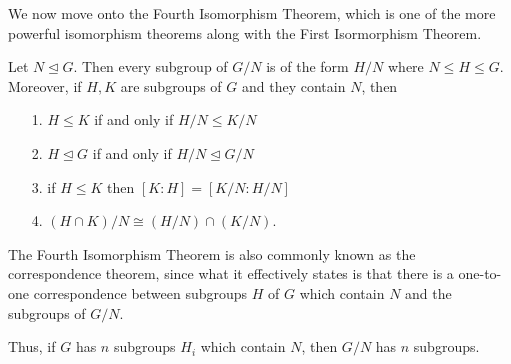 \documentclass[12pt,letterpaper]{algebra_book}
\newcommand{\normal}{\unlhd}
\theoremstyle{definition}
\begin{document}
    We now move onto the Fourth Isomorphism Theorem, which is one of
    the more powerful isomorphism theorems along with the First
    Isormorphism Theorem. 

    \begin{thm}
        Let $N \normal G.$ Then every subgroup of $G/N$ is of the form
        $H/N$ where $N \le H \le G$. Moreover, if $H, K$ are subgroups
        of $G$ and they contain $N$, then 
        \begin{itemize}
            \item[1.] $H \le K$ if and only if $H/N \le K/N$
            \item[2.] $H \normal G$ if and only if $H/N \normal G/N$ 
            \item[3.] if $H \le K$ then $[K:H] = [K/N:H/N]$
            \item[4.] $(H \cap K)/N \cong (H/N) \cap (K/N)$.    
        \end{itemize} 
    \end{thm}
    

    \begin{minipage}{0.4\textwidth}
    \end{minipage}\hfill
    \begin{minipage}{0.55\textwidth}
        The Fourth Isomorphism Theorem is also commonly known as the
        correspondence theorem, since what it effectively states is that
        there is a one-to-one correspondence between subgroups $H$ of $G$
        which contain $N$ and the subgroups of $G/N$.

        Thus, if $G$ has $n$ subgroups $H_i$ which contain $N$, then $G/N$
        has $n$ subgroups.
    \end{minipage}
\end{document}
